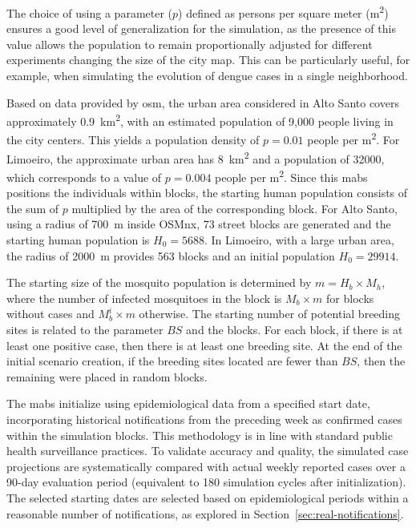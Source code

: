 The choice of using a parameter ($p$) defined as persons per square meter (m\textsuperscript{2}) ensures a good level of generalization for the simulation, as the presence of this value allows the population to remain proportionally adjusted for different experiments changing the size of the city map. This can be particularly useful, for example, when simulating the evolution of dengue cases in a single neighborhood.

Based on data provided by \gls{osm}, the urban area considered in Alto Santo covers approximately 0.9~km\textsuperscript{2}, with an estimated population of 9,000 people living in the city centers. This yields a population density of $p = 0.01$ people per m\textsuperscript{2}. For Limoeiro, the approximate urban area has 8~km\textsuperscript{2} and a population of 32000, which corresponds to a value of \( p = 0.004 \) people per m\textsuperscript{2}. Since this \gls{mabs} positions the individuals within blocks, the starting human population consists of the sum of $p$ multiplied by the area of the corresponding block. For Alto Santo, using a radius of 700~m inside OSMnx, 73 street blocks are generated and the starting human population is $H_0 = 5688$. In Limoeiro, with a large urban area, the radius of 2000~m provides 563 blocks and an initial population $H_0 = 29914$. 

The starting size of the mosquito population is determined by $m = H_b \times M_h$, where the number of infected mosquitoes in the block is $M_b \times m$ for blocks without cases and $M_b^{i} \times m$ otherwise. The starting number of potential breeding sites is related to the parameter $BS$ and the blocks. For each block, if there is at least one positive case, then there is at least one breeding site. At the end of the initial scenario creation, if the breeding sites located are fewer than $BS$, then the remaining were placed in random blocks. 

The \gls{mabs} initialize using epidemiological data from a specified start date, incorporating historical notifications from the preceding week as confirmed cases within the simulation blocks.
This methodology is in line with standard public health surveillance practices. 
To validate accuracy and quality, the simulated case projections are systematically compared with actual weekly reported cases over a 90-day evaluation period (equivalent to 180 simulation cycles after initialization). The selected starting dates are selected based on epidemiological periods within a reasonable number of notifications, as explored in Section~\ref{sec:real-notifications}.

